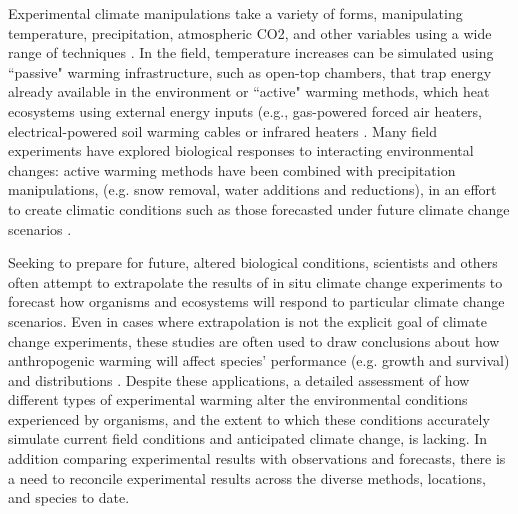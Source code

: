 \documentclass{article}
\begin{document}
\par Experimental climate manipulations take a variety of forms, manipulating temperature, precipitation, atmospheric CO2, and other variables using a wide range of techniques \citep{shaver2000,aronson2009}. In the field, temperature increases can be simulated using ``passive" warming infrastructure, such as open-top chambers, that trap energy already available in the environment or ``active" warming methods, which heat ecosystems using external energy inputs (e.g., gas-powered forced air heaters, electrical-powered soil warming cables or infrared heaters \citep{shaver2000}. Many field experiments have explored biological responses to interacting environmental changes: active warming methods have been combined with precipitation manipulations, (e.g. snow removal,  water additions and reductions), in  an  effort to create  climatic  conditions such  as  those  forecasted  under  future climate  change scenarios \citep{price1998,cleland2006,sherry2007,rollinson2012}.
\par Seeking to prepare  for future, altered  biological conditions, scientists and others  often attempt to extrapolate the results of in situ climate change experiments to forecast how organisms and ecosystems will respond to particular climate change scenarios.  Even in cases where extrapolation is not the explicit goal of climate change experiments, these studies are often used to draw conclusions  about how anthropogenic warming  will affect species' performance  (e.g. growth and  survival)  and  distributions \citep{dukes1999,hobbie1999,reich2015,gruner2016}.  Despite these applications, a detailed  assessment of how different types of experimental warming alter the environmental conditions experienced by organisms, and the extent to which these conditions accurately simulate current field conditions and anticipated climate change, is lacking.  In addition comparing experimental results with observations and forecasts, there is a need to reconcile experimental results across the diverse methods, locations, and species to date. 
\end{document}
